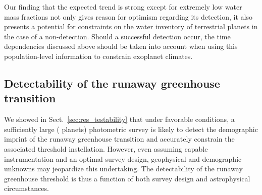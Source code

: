 \documentclass[modern]{aastex631}
\begin{document}
\begin{note}
Our finding that the expected trend is strong except for extremely low water mass fractions not only gives reason for optimism regarding its detection, it also presents a potential for constraints on the water inventory of terrestrial planets in the case of a non-detection.
Should a successful detection occur, the time dependencies discussed above should be taken into account when using this population-level information to constrain exoplanet climates.

\end{note}





\subsection{Detectability of the runaway greenhouse transition}
We showed in Sect.~\ref{sec:res_testability} that under favorable conditions, a sufficiently large ( planets) photometric survey is likely to detect the demographic imprint of the runaway greenhouse transition and accurately constrain the associated threshold instellation.
However, even assuming capable instrumentation and an optimal survey design, geophysical and demographic unknowns may jeopardize this undertaking.
The detectability of the runaway greenhouse threshold is thus a function of both survey design and astrophysical circumstances.
\end{document}
